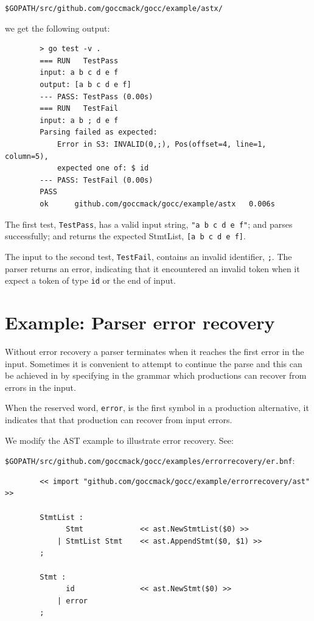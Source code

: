 \documentclass[12pt]{article}
\begin{document}
	\verb|$GOPATH/src/github.com/goccmack/gocc/example/astx/|

	we get the following output:

	\begin{verbatim}
		> go test -v .
		=== RUN   TestPass
		input: a b c d e f
		output: [a b c d e f]
		--- PASS: TestPass (0.00s)
		=== RUN   TestFail
		input: a b ; d e f
		Parsing failed as expected: 
		    Error in S3: INVALID(0,;), Pos(offset=4, line=1, column=5), 
		    expected one of: $ id
		--- PASS: TestFail (0.00s)
		PASS
		ok      github.com/goccmack/gocc/example/astx   0.006s	\end{verbatim}

	The first test, \verb"TestPass", has a valid input string, \verb|"a b c d e f"|; and parses successfully; and returns the expected StmtList, \verb|[a b c d e f]|.

	The input to the second test, \verb|TestFail|, contains an invalid identifier, \verb|;|. The parser returns an error, indicating that it encountered an invalid token when it expect a token of type \verb|id| or the end of input.

\section{Example: Parser error recovery} \label{sec:error recovery}
	Without error recovery a \gocc parser terminates when it reaches the first error in the input. Sometimes it is convenient to attempt to continue the parse and this can be achieved in \gocc by specifying in the grammar which productions can recover from errors in the input.

	When the \gocc reserved word, \verb|error|, is the first symbol in a production alternative, it indicates that that production can recover from input errors.

	We modify the AST example to illustrate error recovery. See:

	\verb|$GOPATH/src/github.com/goccmack/gocc/examples/errorrecovery/er.bnf|:

	\begin{verbatim}
		<< import "github.com/goccmack/gocc/example/errorrecovery/ast" >>

		StmtList :
		      Stmt             << ast.NewStmtList($0) >>
		    | StmtList Stmt    << ast.AppendStmt($0, $1) >>
		;

		Stmt :
		      id               << ast.NewStmt($0) >>
		    | error
		;
	\end{verbatim}
\end{document}
